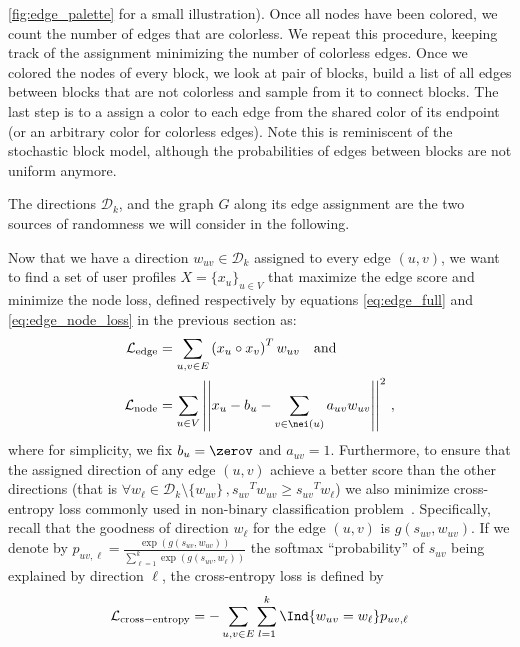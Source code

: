 \autoref{fig:edge_palette} for a small illustration). Once all nodes have been colored, we count the
number of edges that are colorless. We repeat this procedure, keeping track of the assignment
minimizing the number of colorless edges. Once we colored the nodes of every block, we look at pair
of blocks, build a list of all edges between blocks that are not colorless and sample from it to
connect blocks. The last step is to a assign a color to each edge from the shared color of its
endpoint (or an arbitrary color for colorless edges). Note this is reminiscent of the stochastic
block model, although the probabilities of edges between blocks are not uniform anymore.

The directions $\mathcal{D}_k$, and the graph $G$ along its edge assignment are the two sources of
randomness we will consider in the following.

\bigskip

Now that we have a direction $w_{uv} \in \mathcal{D}_k$ assigned to every edge $(u,v)$, we want to
find a set of user profiles $X=\{x_u\}_{u\in V}$ that maximize the edge score and minimize the node
loss, defined respectively by equations \eqref{eq:edge_full} and
\eqref{eq:edge_node_loss} in the previous section as:
\begin{align*}
  \mathcal{L}_{\mathrm{edge}} &=
  \sum_{u,v \in E} \left(x_u \circ x_v\right)^T w_{uv} \quad \text{and} \\
  \mathcal{L}_{\mathrm{node}} &=
  \sum_{u\in V} \left|\left| x_u - b_u - \sum_{v \in \nei(u)} a_{uv} w_{uv} \right|\right|^2\,,
\end{align*}
where for simplicity, we fix $b_u = \zerov$ and $a_{uv} = 1$. Furthermore, to ensure that the
assigned direction of any edge $(u,v)$ achieve a better score than the other directions (that is
$\forall w_\ell \in \mathcal{D}_k \setminus \{w_{uv}\}\,, {s_{uv}}^T w_{uv} \geq  {s_{uv}}^T
w_\ell$) we also minimize cross-entropy loss commonly used in non-binary classification
problem~\autocite[Section 4.3.4]{PRML06}.  Specifically, recall that the goodness of direction
$w_\ell$ for the edge $(u,v)$ is $g(s_{uv}, w_{uv})$. If we denote by $p_{uv,\ell} = \frac{\exp
\left( g(s_{uv}, w_{uv}) \right)}{\sum_{\ell=1}^k \exp \left( g(s_{uv}, w_\ell) \right)}$ the
softmax \enquote{probability} of $s_{uv}$ being explained by direction $\ell$, the cross-entropy
loss is defined by
\begin{equation*}
  \mathcal{L}_{\mathrm{cross-entropy}} = -\sum_{u,v \in E} \sum_{l=1}^k
  \Ind{w_{uv} = w_\ell} p_{uv,\ell}
\end{equation*}

